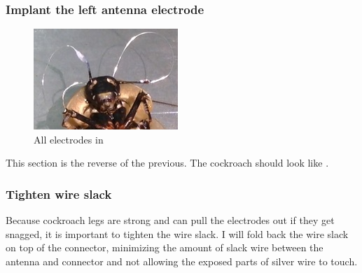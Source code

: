 \subsubsection{Implant the left antenna electrode}
\begin{figure}[ht!]
\centering
\includegraphics[scale=0.7]{Surgery Photos/lelectrode.jpg}
\caption{All electrodes in}
\label{fig:lelectrode}
\end{figure}
This section is the reverse of the previous. The cockroach should look like .

\subsubsection{Tighten wire slack}
Because cockroach legs are strong and can pull the electrodes out if they get snagged, it is important to tighten the wire slack. I will fold back the wire slack on top of the connector, minimizing the amount of slack wire between the antenna and connector and not allowing the exposed parts of silver wire to touch. 

